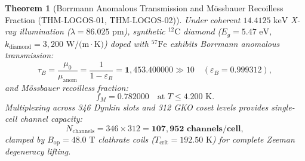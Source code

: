 \documentclass[11pt,onecolumn]{article}
\newtheorem{theorem}{Theorem}
\begin{document}
\begin{theorem}[Borrmann Anomalous Transmission and Mössbauer Recoilless Fraction (THM-LOGOS-01, THM-LOGOS-02)]
\label{thm:logos_borrmann_physics}
Under coherent $14.4125\text{ keV}$ X-ray illumination ($\lambda = 86.025\text{ pm}$), synthetic $^{12}\text{C}$ diamond ($E_g = 5.47\text{ eV}$, $k_{\text{diamond}} = 3{,}200\text{ W/(m}\cdot\text{K)}$) doped with $^{57}\text{Fe}$ exhibits Borrmann anomalous transmission:
\begin{equation}
\tau_B = \frac{\mu_0}{\mu_{\text{anom}}} = \frac{1}{1 - \varepsilon_B} = \mathbf{1{,}453.400000} \gg 10 \quad (\varepsilon_B = 0.999312),
\label{eq:borrmann_tau_b}
\end{equation}
and Mössbauer recoilless fraction:
\begin{equation}
f_M = \mathbf{0.782000} \quad \text{at } T \le 4.200\text{ K}.
\label{eq:mossbauer_f_m}
\end{equation}
Multiplexing across 346 Dynkin slots and 312 GKO coset levels provides single-cell channel capacity:
\begin{equation}
N_{\text{channels}} = 346 \times 312 = \mathbf{107{,}952\text{ channels/cell}},
\label{eq:cell_channel_density}
\end{equation}
clamped by $B_{\text{op}} = 48.0\text{ T}$ clathrate coils ($T_{\text{crit}} = 192.50\text{ K}$) for complete Zeeman degeneracy lifting.
\end{theorem}
\end{document}
